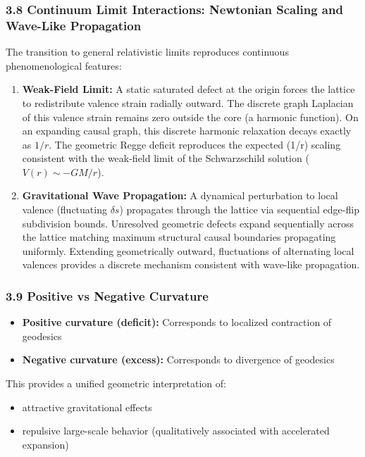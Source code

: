 \documentclass[
]{article}
\providecommand{\tightlist}{%
  \setlength{\itemsep}{0pt}\setlength{\parskip}{0pt}}
\begin{document}
\subsubsection{3.8 Continuum Limit Interactions: Newtonian Scaling and
Wave-Like
Propagation}\label{continuum-limit-interactions-newtonian-scaling-and-wave-like-propagation}

The transition to general relativistic limits reproduces continuous
phenomenological features:

\begin{enumerate}
\def\labelenumi{\arabic{enumi}.}
\item
  \textbf{Weak-Field Limit:} A static saturated defect at the origin
  forces the lattice to redistribute valence strain radially outward.
  The discrete graph Laplacian of this valence strain remains zero
  outside the core (a harmonic function). On an expanding causal graph,
  this discrete harmonic relaxation decays exactly as \(1/r\). The
  geometric Regge deficit reproduces the expected (1/r) scaling
  consistent with the weak-field limit of the Schwarzschild solution
  (\(V(r) \sim -GM/r\)).
\item
  \textbf{Gravitational Wave Propagation:} A dynamical perturbation to
  local valence (fluctuating \(\delta s\)) propagates through the
  lattice via sequential edge-flip subdivision bounds. Unresolved
  geometric defects expand sequentially across the lattice matching
  maximum structural causal boundaries propagating uniformly. Extending
  geometrically outward, fluctuations of alternating local valences
  provides a discrete mechanism consistent with wave-like propagation.
\end{enumerate}

\subsubsection{3.9 Positive vs Negative
Curvature}\label{positive-vs-negative-curvature}

\begin{itemize}
\item
  \textbf{Positive curvature (deficit):} Corresponds to localized
  contraction of geodesics
\item
  \textbf{Negative curvature (excess):} Corresponds to divergence of
  geodesics
\end{itemize}

This provides a unified geometric interpretation of:

\begin{itemize}
\tightlist
\item
  attractive gravitational effects
\item
  repulsive large-scale behavior (qualitatively associated with
  accelerated expansion)
\end{itemize}
\end{document}
